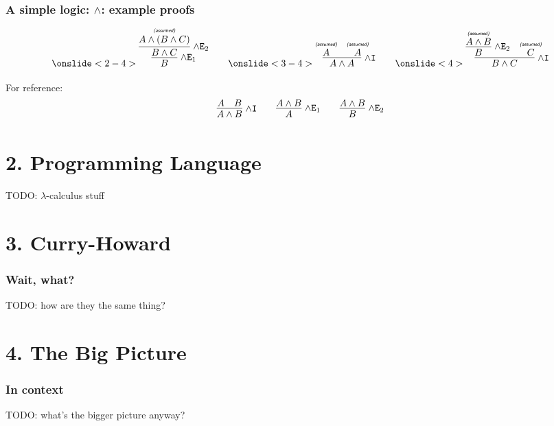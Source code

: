 \documentclass{beamer}
\newcommand{\isassumed}{\textsf{\tiny{\emph{(assumed)}}}}
\newcommand{\assumed}[1]{\deduce{#1}{\isassumed}}
\begin{document}
\begin{frame}
  \frametitle{A simple logic: $\wedge$: example proofs}
  \[
  \onslide<2-4>{
    \infer[\!\wedge\rn{E}_1]{B}{
      \infer[\!\wedge\rn{E}_2]{B \wedge C}{
        \assumed{A \wedge (B \wedge C)}}
    }
  }
  \qquad
  \onslide<3-4>{
    \infer[\!\wedge\rn{I}]{A \wedge A}{\assumed{A} & \assumed{A}}
  }
  \qquad
  \onslide<4>{
    \infer[\!\wedge\rn{I}]{B \wedge C}{
      \infer[\!\wedge\rn{E}_2]{B}{\assumed{A \wedge B}}
      & \assumed{C}}
  }
  \]

  {\small For reference:
  \[
  \infer[\!\wedge\rn{I}]{A \wedge B}{A & B} \qquad
  \infer[\!\wedge\rn{E}_1]{A}{A \wedge B} \qquad
  \infer[\!\wedge\rn{E}_2]{B}{A \wedge B}
  \]
  }
\end{frame}


\section{2. Programming Language}

\begin{frame}
  TODO: $\lambda$-calculus stuff
\end{frame}


\section{3. Curry-Howard}

\begin{frame}
  \frametitle{Wait, what?}
  TODO: how are they the same thing?
\end{frame}


\section{4. The Big Picture}

\begin{frame}
  \frametitle{In context}
  TODO: what's the bigger picture anyway?
\end{frame}
\end{document}
